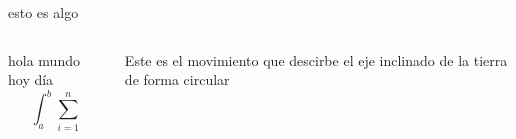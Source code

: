 \documentclass[utf8,spanish,
xcolor={x11names, table},14pt,handout]{beamer} %
\begin{document}
\begin{frame}
	\begin{example}
		esto es algo
	\end{example}
\end{frame}

\begin{frame}
\begin{columns}[T]
	\begin{column}{5cm}%
		hola mundo hoy día
		$$
		\int_a^b\sum_{i=1}^{n}%
		$$
	\end{column}

	\begin{column}{5cm}%
		Este es el movimiento que descirbe el eje inclinado de la tierra de forma circular
	\end{column}

\end{columns}
\end{frame}
\end{document}
